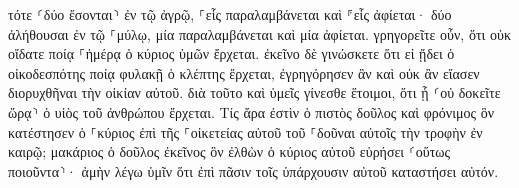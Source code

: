 \documentclass{openreader}
\begin{document}
τότε ⸂δύο ἔσονται⸃ ἐν τῷ ἀγρῷ, ⸀εἷς παραλαμβάνεται καὶ ⸁εἷς ἀφίεται· 
δύο ἀλήθουσαι ἐν τῷ ⸀μύλῳ, μία παραλαμβάνεται καὶ μία ἀφίεται. 
γρηγορεῖτε οὖν, ὅτι οὐκ οἴδατε ποίᾳ ⸀ἡμέρᾳ ὁ κύριος ὑμῶν ἔρχεται. 
ἐκεῖνο δὲ γινώσκετε ὅτι εἰ ᾔδει ὁ οἰκοδεσπότης ποίᾳ φυλακῇ ὁ κλέπτης ἔρχεται, ἐγρηγόρησεν ἂν καὶ οὐκ ἂν εἴασεν διορυχθῆναι τὴν οἰκίαν αὐτοῦ. 
διὰ τοῦτο καὶ ὑμεῖς γίνεσθε ἕτοιμοι, ὅτι ᾗ ⸂οὐ δοκεῖτε ὥρᾳ⸃ ὁ υἱὸς τοῦ ἀνθρώπου ἔρχεται. 
Τίς ἄρα ἐστὶν ὁ πιστὸς δοῦλος καὶ φρόνιμος ὃν κατέστησεν ὁ ⸀κύριος ἐπὶ τῆς ⸀οἰκετείας αὐτοῦ τοῦ ⸀δοῦναι αὐτοῖς τὴν τροφὴν ἐν καιρῷ; 
μακάριος ὁ δοῦλος ἐκεῖνος ὃν ἐλθὼν ὁ κύριος αὐτοῦ εὑρήσει ⸂οὕτως ποιοῦντα⸃· 
ἀμὴν λέγω ὑμῖν ὅτι ἐπὶ πᾶσιν τοῖς ὑπάρχουσιν αὐτοῦ καταστήσει αὐτόν. 
\end{document}

